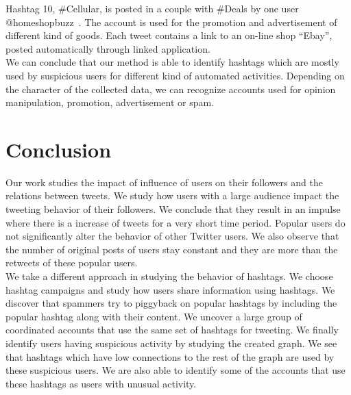 \documentclass[journal, a4paper, 12pt]{article}
\begin{document}
Hashtag 10, \#Cellular, is posted in a couple with \#Deals by one user @homeshopbuzz~\cite{homeshopbuzz}. The account is used for the promotion and advertisement of different kind of goods. Each tweet contains a link to an on-line shop ``Ebay'', posted automatically through linked application.
\\
 
We can conclude that our method is able to identify hashtags which are mostly used by suspicious users for different kind of automated activities. Depending on the character of the collected data, we can recognize accounts used for opinion manipulation, promotion, advertisement or spam.





	

\section{Conclusion}
Our work studies the impact of influence of users on their followers and the relations between tweets. We study how users with a large audience impact the tweeting behavior of their followers. We conclude that they result in an impulse where there is a increase of tweets for a very short time period. Popular users do not significantly alter the behavior of other Twitter users. We also observe that the number of original posts of users stay constant and they are more than the retweets of these popular users. \\

We take a different approach in studying the behavior of hashtags. We choose hashtag campaigns and study how users share information using hashtags. We discover that spammers try to piggyback on popular hashtags by including the popular hashtag along with their content. We uncover a large group of coordinated accounts that use the same set of hashtags for tweeting. We finally identify users having suspicious activity by studying the created graph. We see that hashtags which have low connections to the rest of the graph are used by these suspicious users. We are also able to identify some of the accounts that use these hashtags as users with unusual activity.
\end{document}
